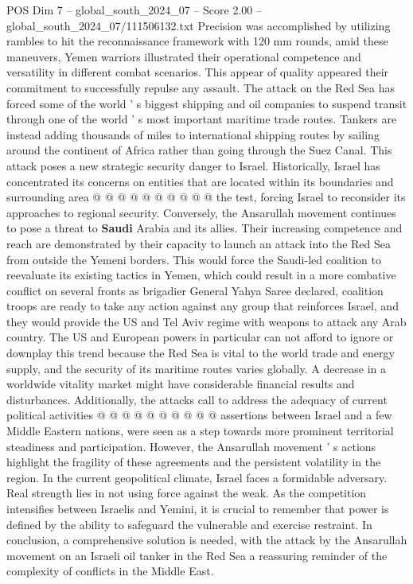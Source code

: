 \begin{textsample}{POS Dim 7 – global\_south\_2024\_07 – Score 2.00 – global\_south\_2024\_07/111506132.txt}
Precision was accomplished by utilizing rambles to hit the reconnaissance framework with 120 mm rounds, amid these maneuvers, Yemen warriors illustrated their operational competence and versatility in different combat scenarios.
This appear of quality appeared their commitment to successfully repulse any assault.
The attack on the Red Sea has forced some of the world ' s biggest shipping and oil companies to suspend transit through one of the world ' s most important maritime trade routes.
Tankers are instead adding thousands of miles to international shipping routes by sailing around the continent of Africa rather than going through the Suez Canal.
This attack poses a new strategic security danger to Israel.
Historically, Israel has concentrated its concerns on entities that are located within its boundaries and surrounding area @ @ @ @ @ @ @ @ @ @ the test, forcing Israel to reconsider its approaches to regional security.
Conversely, the Ansarullah movement continues to pose a threat to \textbf{Saudi} Arabia and its allies.
Their increasing competence and reach are demonstrated by their capacity to launch an attack into the Red Sea from outside the Yemeni borders.
This would force the Saudi-led coalition to reevaluate its existing tactics in Yemen, which could result in a more combative conflict on several fronts as brigadier General Yahya Saree declared, coalition troops are ready to take any action against any group that reinforces Israel, and they would provide the US and Tel Aviv regime with weapons to attack any Arab country.
The US and European powers in particular can not afford to ignore or downplay this trend because the Red Sea is vital to the world trade and energy supply, and the security of its maritime routes varies globally.
A decrease in a worldwide vitality market might have considerable financial results and disturbances.
Additionally, the attacks call to address the adequacy of current political activities @ @ @ @ @ @ @ @ @ @ assertions between Israel and a few Middle Eastern nations, were seen as a step towards more prominent territorial steadiness and participation.
However, the Ansarullah movement ' s actions highlight the fragility of these agreements and the persistent volatility in the region.
In the current geopolitical climate, Israel faces a formidable adversary.
Real strength lies in not using force against the weak.
As the competition intensifies between Israelis and Yemini, it is crucial to remember that power is defined by the ability to safeguard the vulnerable and exercise restraint.
In conclusion, a comprehensive solution is needed, with the attack by the Ansarullah movement on an Israeli oil tanker in the Red Sea a reassuring reminder of the complexity of conflicts in the Middle East.

\end{textsample}
